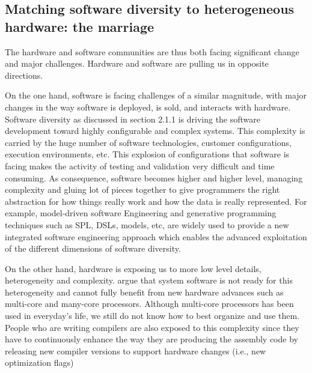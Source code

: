 \subsection{Matching software diversity to heterogeneous hardware: the marriage}

The hardware and software communities are thus both facing significant change and major challenges. Hardware and software are pulling us in opposite directions. 

On the one hand, software is facing challenges of a similar magnitude, with major changes in the way software is deployed, is sold, and interacts with hardware. 
Software diversity as discussed in section 2.1.1 is driving the software development toward highly configurable and complex systems. This complexity is carried by the huge number of software technologies, customer configurations, execution environments, etc. This explosion of configurations that software is facing makes the activity of testing and validation very difficult and time consuming. 
As consequence, software becomes higher and higher level, managing complexity and gluing lot of pieces together to give programmers the right abstraction for how things really work and how the data is really represented. 
For example, model-driven software Engineering and generative programming techniques such as SPL, DSLs, models, etc, are widely used to provide a new integrated software engineering approach which enables the advanced exploitation of the different dimensions of software diversity.

On the other hand, hardware is exposing us to more low level details, heterogeneity and complexity.
\cite{he2010computer,cao2012yin} argue that system software is not ready for this heterogeneity and cannot fully benefit from new hardware advances such as multi-core and many-core processors. Although multi-core processors has been used in everyday’s life, we still do not know how to best organize and use them. 
People who are writing compilers are also exposed to this complexity since they have to continuously enhance the way they are producing the assembly code by releasing new compiler versions to support hardware changes (i.e., new optimization flags)



